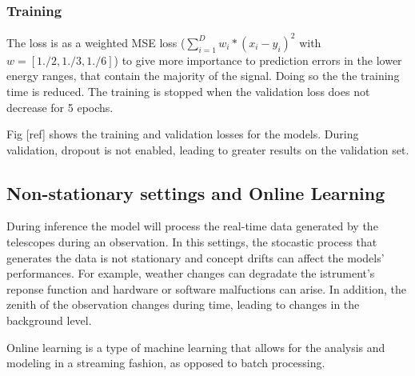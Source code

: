\subsubsection{Training}
The loss is as a weighted MSE loss ($\sum_{i=1}^{D}w_i*(x_i-y_i)^2$ with $w=[1./2, 1./3, 1./6]$) to give more importance to prediction errors in the lower energy ranges, that contain the majority of the signal. Doing so the the training time is reduced. The training is stopped when the validation loss does not decrease for 5 epochs. 


Fig [ref] shows the training and validation losses for the models. During validation, dropout is not enabled, leading to greater results on the validation set. 





\subsection{Non-stationary settings and Online Learning}
During inference the model will process the real-time data generated by the telescopes during an observation. In this settings, the stocastic process that generates the data
is not stationary and concept drifts can affect the models' performances. For example, weather changes can degradate the istrument's reponse function and hardware or software malfuctions can arise. 
In addition, the zenith of the observation changes during time, leading to changes in the background level.  

Online learning is a type of machine learning that allows for the analysis and modeling in a streaming fashion, as opposed to batch processing. 

